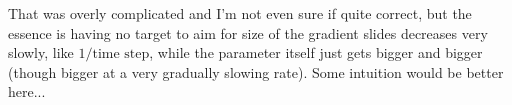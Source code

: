 \begin{answer}
That was overly complicated and I'm not even sure if quite correct, but the essence is having no target to aim for size of the gradient slides decreases very slowly, like $1/\text{time step}$, while the parameter itself just gets bigger and bigger (though bigger at a very gradually slowing rate). Some intuition would be better here...
\end{answer}
%